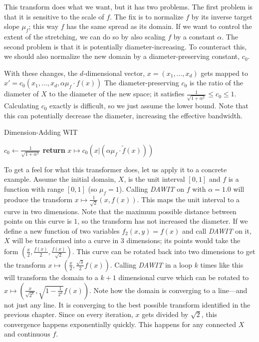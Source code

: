 This transform does what we want, but it has two problems.
The first problem is that it is sensitive to the scale of $f$.
The fix is to normalize $f$ by its inverse target slope $\mu_f$; this way
$f$ has the same spread as its domain.
If we want to control the extent of the stretching, we can do so by also
scaling $f$ by a constant $\alpha$.
The second problem is that it is potentially diameter-increasing.
To counteract this, we should also normalize the new domain by 
a diameter-preserving constant, $c_0$.

With these changes, the $d$-dimensional vector, $x = (x_1, \ldots, x_d)$
gets mapped to $x' = c_0(x_1, \ldots, x_d, \alpha\mu_f\cdot f(x))$
The diameter-preserving $c_0$ is the ratio of the diameter of $X$ to the
diameter of the new space;
it satisfies  $\frac{1}{\sqrt{1+\alpha^2}} \leq c_0 \leq 1$.
Calculating $c_0$ exactly is difficult, so we just assume the lower
bound.
Note that this can potentially decrease the diameter, increasing the effective
bandwidth.

\begin{algorithm}
\caption{Dimension-Adding WIT}\label{dawitalg}
\begin{algorithmic}[1]
	\State $c_0 \gets \frac{1}{\sqrt{1+\alpha^2}}$
	\State\textbf{return}
          $x\mapsto c_0(x | (\alpha\mu_f\cdot\tilde f(x)))$
\EndProcedure
\end{algorithmic}
\end{algorithm}

To get a feel for what this transformer does, let us apply it to a concrete
example.
Assume the initial domain, $X$, is the unit interval $[0,1]$ and $f$ is a
function with range $[0,1]$ (so $\mu_f = 1$).
Calling \textit{DAWIT} on $f$ with $\alpha = 1.0$ will produce the
transform $x \mapsto \frac{1}{\sqrt{2}}(x, f(x))$.
This maps the unit interval to a curve in two dimensions.
Note that the maximum possible distance between points on this curve is $1$,
so the transform has not increased the diameter.
If we define a new function of two variables $f_2(x,y) = f(x)$ and call
 \textit{DAWIT} on it,
$X$ will be transformed into a curve in 3 dimensions; its points would take
the form $(\frac{x}{2}, \frac{f(x)}{2}, \frac{f(x)}{\sqrt{2}})$.
This curve can be rotated back into two dimensions to get the transform
$x \mapsto (\frac{x}{2}, \frac{\sqrt{3}}{2}f(x))$.
Calling \textit{DAWIT} in a loop $k$ times like this will transform the
domain to a $k+1$ dimensional curve which can be rotated to
$x \mapsto (\frac{x}{\sqrt{2^k}}, \sqrt{1-\frac{1}{2^k}}f(x))$.
Note how the domain is converging to a line---and not just any line.
It is converging to the best possible transform identified in the previous
chapter.
Since on every iteration, $x$ gets divided by $\sqrt{2}$,
this convergence happens exponentially quickly.
This happens for any connected $X$ and continuous $f$.


